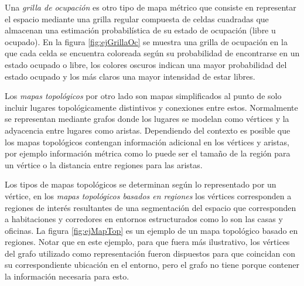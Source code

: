 Una \emph{grilla de ocupación} es otro tipo de mapa métrico que consiste en representar el espacio mediante una grilla regular compuesta de celdas cuadradas que almacenan una estimación probabilística de su estado de ocupación (libre u ocupado). En la figura \ref{fig:ejGrillaOc} se muestra una grilla de ocupación en la que cada celda se encuentra coloreada según su probabilidad de encontrarse en un estado ocupado o libre, los colores oscuros indican una mayor probabilidad del estado ocupado y los más claros una mayor intensidad de estar libres.

Los \emph{mapas topológicos} por otro lado son mapas simplificados al punto de solo incluir lugares topológicamente distintivos y conexiones entre estos. Normalmente se representan mediante grafos donde los lugares se modelan como vértices y la adyacencia entre lugares como aristas. Dependiendo del contexto es posible que los mapas topológicos contengan información adicional en los vértices y aristas, por ejemplo información métrica como lo puede ser el tamaño de la región para un vértice o la distancia entre regiones para las aristas.

Los tipos de mapas topológicos se determinan según lo representado por un vértice, en los \emph{mapas topológicos basados en regiones} los vértices corresponden a regiones de interés resultantes de una segmentación del espacio que corresponden a habitaciones y corredores en entornos estructurados como lo son las casas y oficinas. La figura \ref{fig:ejMapTop} es un ejemplo de un mapa topológico basado en regiones. Notar que en este ejemplo, para que fuera más ilustrativo, los vértices del grafo utilizado como representación fueron dispuestos para que coincidan con su correspondiente ubicación en el entorno, pero el grafo no tiene porque contener la información necesaria para esto.

